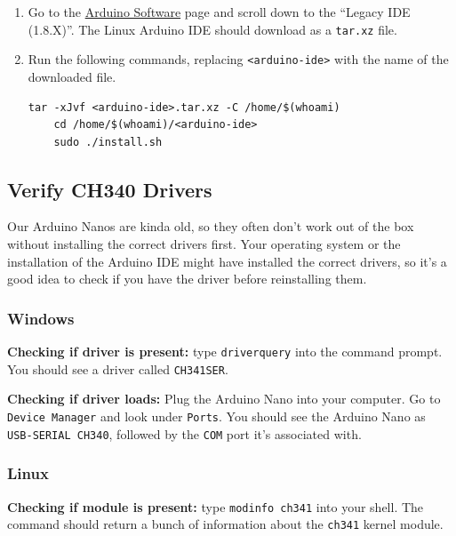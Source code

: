 \documentclass{article}
\begin{document}
\begin{enumerate}
    \item Go to the \href{https://www.tinkercad.com/things/cGKh5f8nkDv}{Arduino Software} page and scroll down to the ``Legacy IDE (1.8.X)''. The Linux Arduino IDE should download as a \verb|tar.xz| file.
    \item Run the following commands, replacing \verb|<arduino-ide>| with the name of the downloaded file.
    \begin{lstlisting}[style=bashstyle, label=lst:mybashcode]
    tar -xJvf <arduino-ide>.tar.xz -C /home/$(whoami)
    cd /home/$(whoami)/<arduino-ide>
    sudo ./install.sh
    \end{lstlisting}
\end{enumerate}

\subsection{Verify CH340 Drivers}

Our Arduino Nanos are kinda old, so they often don't work out of the box without installing the correct drivers first. Your operating system or the installation of the Arduino IDE might have installed the correct drivers, so it's a good idea to check if you have the driver before reinstalling them.

\subsubsection{Windows}

{\bf Checking if driver is present: } type \verb|driverquery| into the command prompt. You should see a driver called \verb|CH341SER|. 

\vspace{1em}

{\bf Checking if driver loads: } Plug the Arduino Nano into your computer. Go to \verb|Device Manager| and look under \verb|Ports|. You should see the Arduino Nano as \verb|USB-SERIAL CH340|, followed by the \verb|COM| port it's associated with.

\subsubsection{Linux}

{\bf Checking if module is present: } type \verb|modinfo ch341| into your shell. The command should return a bunch of information about the \verb|ch341| kernel module.
\end{document}
